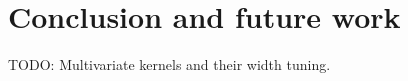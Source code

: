 \chapter{Conclusion and future work}
\label{chap:conclusion}

{\color{red} TODO: Multivariate kernels and their width tuning.}